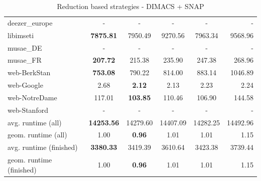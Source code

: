 \documentclass[a4paper,UKenglish,cleveref, autoref, thm-restate]{lipics-v2021}
\begin{document}
\begin{table}
\begin{center}
\begin{tabular}{|l| c| c| c| c| r|}
			deezer\_europe & - & - & - & - & - \\
			libimseti & \textbf{7875.81} & 7950.49 & 9270.56 & 7963.34 & 9568.96 \\
			musae\_DE & - & - & - & - & - \\
			musae\_FR & \textbf{207.72} & 215.38 & 235.90 & 247.38 & 268.96 \\
			web-BerkStan & \textbf{753.08} & 790.22 & 814.00 & 883.14 & 1046.89 \\
			web-Google & 2.68 & \textbf{2.12} & 2.13 & 2.23 & 2.24 \\
			web-NotreDame & 117.01 & \textbf{103.85} & 110.46 & 106.90 & 144.58 \\
			web-Stanford & - & - & - & - & - \\
			\hline
			avg. runtime (all) & \textbf{14253.56} & 14279.60 & 14407.09 & 14282.25 & 14492.96 \\
			geom. runtime (all) & 1.00 & \textbf{0.96} & 1.01 & 1.01 & 1.15 \\
			avg. runtime (finished) & \textbf{3380.33} & 3419.39 & 3610.64 & 3423.38 & 3739.44 \\
			geom. runtime (finished) & 1.00 & \textbf{0.96} & 1.01 & 1.01 & 1.15 \\
			\hline
		\end{tabular}
	\end{center}
	\caption{Reduction based strategies - DIMACS + SNAP}
\end{table}
\end{document}
